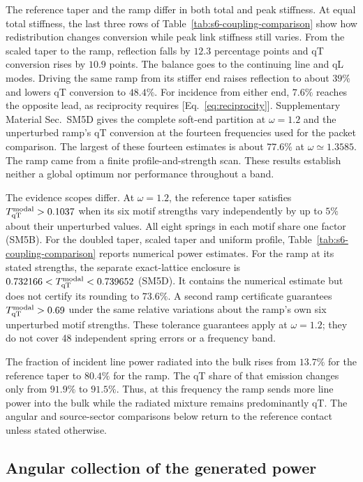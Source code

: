 \documentclass[10pt,aps,onecolumn,floatfix,notitlepage,nofootinbib,showkeys]{revtex4-2}
\newcommand{\qT}{\mathrm{qT}}
\begin{document}
The reference taper and the ramp differ in both total and peak stiffness. At equal total stiffness, the last three rows of Table~\ref{tab:s6-coupling-comparison} show how redistribution changes conversion while peak link stiffness still varies. From the scaled taper to the ramp, reflection falls by $12.3$ percentage points and qT conversion rises by $10.9$ points. The balance goes to the continuing line and qL modes. Driving the same ramp from its stiffer end raises reflection to about $39\%$ and lowers qT conversion to $48.4\%$. For incidence from either end, $7.6\%$ reaches the opposite lead, as reciprocity requires [Eq.~\eqref{eq:reciprocity}]. Supplementary Material Sec.~SM5D gives the complete soft-end partition at $\omega=1.2$ and the unperturbed ramp's qT conversion at the fourteen frequencies used for the packet comparison. The largest of these fourteen estimates is about $77.6\%$ at $\omega\simeq1.3585$. The ramp came from a finite profile-and-strength scan. These results establish neither a global optimum nor performance throughout a band.

The evidence scopes differ. At $\omega=1.2$, the reference taper satisfies $T_{\qT}^{\rm modal}>0.1037$ when its six motif strengths vary independently by up to $5\%$ about their unperturbed values. All eight springs in each motif share one factor (SM5B). For the doubled taper, scaled taper and uniform profile, Table~\ref{tab:s6-coupling-comparison} reports numerical power estimates. For the ramp at its stated strengths, the separate exact-lattice enclosure is $0.732166<T_{\qT}^{\rm modal}<0.739652$ (SM5D). It contains the numerical estimate but does not certify its rounding to $73.6\%$. A second ramp certificate guarantees $T_{\qT}^{\rm modal}>0.69$ under the same relative variations about the ramp's own six unperturbed motif strengths. These tolerance guarantees apply at $\omega=1.2$; they do not cover 48 independent spring errors or a frequency band.

The fraction of incident line power radiated into the bulk rises from $13.7\%$ for the reference taper to $80.4\%$ for the ramp. The qT share of that emission changes only from $91.9\%$ to $91.5\%$. Thus, at this frequency the ramp sends more line power into the bulk while the radiated mixture remains predominantly qT. The angular and source-sector comparisons below return to the reference contact unless stated otherwise.

\subsection{Angular collection of the generated power}
\label{pred:sec-collection}
\end{document}
